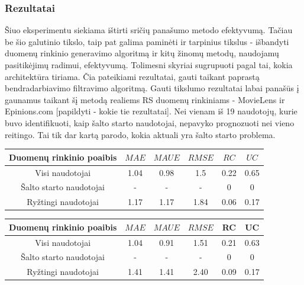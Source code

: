 \documentclass{VUMIFInfMagistrinis}
\begin{document}
\subsubsection{Rezultatai}
Šiuo eksperimentu siekiama ištirti sričių panašumo metodo efektyvumą. Tačiau be šio galutinio tikslo, taip pat galima paminėti ir tarpinius tikslus - išbandyti duomenų rinkinio generavimo algoritmą ir kitų žinomų metodų, naudojamų pasitikėjimų radimui, efektyvumą. Tolimesni skyriai sugrupuoti pagal tai, kokia architektūra tiriama.
\indent
Čia pateikiami rezultatai, gauti taikant paprastą bendradarbiavimo filtravimo algoritmą. Gauti tikslumo rezultatai labai panašūs į gaunamus taikant šį metodą realiems RS duomenų rinkiniams - MovieLens ir Epinions.com [papildyti - kokie tie rezultatai]. Nei vienam iš 19 naudotojų, kurie buvo identifikuoti, kaip šalto starto naudotojai, nepavyko prognozuoti nei vieno reitingo. Tai tik dar kartą parodo, kokia aktuali yra šalto starto problema.
\begin{center}
	\begin{tabular}{||c c c c c c ||} 
		Duomenų rinkinio poaibis & $MAE$ & $MAUE$ & $RMSE$ & $RC$ & $UC$ \\
		\hline
		Visi naudotojai & 1.04 & 0.98 & 1.5 & 0.22 & 0.65 \\
		\hline
		Šalto starto naudotojai & - & - & - & 0 & 0 \\
		\hline
		Ryžtingi naudotojai & 1.17 & 1.17 & 1.84 & 0.06 & 0.17 \\
	\end{tabular}
\end{center}
\begin{center}
	\begin{tabular}{||c c c c c c||} 
		Duomenų rinkinio poaibis & $MAE$ & $MAUE$ & $RMSE$ & RC & UC \\
		\hline
		Visi naudotojai & 1.04 & 0.91 & 1.51 & 0.21 & 0.63 \\
		\hline
		Šalto starto naudotojai & - & - & - & 0 & 0 \\
		\hline
		Ryžtingi naudotojai & 1.41 & 1.41 & 2.40 & 0.09 & 0.17 \\
		
	\end{tabular}
\end{center}
\end{document}
